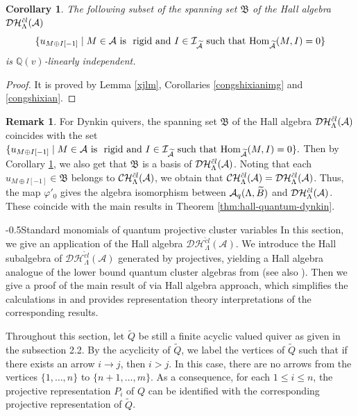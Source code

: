 \documentclass[reqno,12pt]{amsart}
\makeatletter
\numberwithin{equation}{section}
\theoremstyle{plain} %
\newtheorem{corollary}[theorem]{\bf Corollary}
\theoremstyle{definition} %
\newtheorem{remark}[theorem]{\bf Remark}
\renewcommand{\section}{\@startsection{section}{1}{0mm}
  {-\baselineskip}{0.5\baselineskip}{\bf\leftline}}
\makeatother
\begin{document}
\begin{corollary}\label{xxwguan}
The following subset of the spanning set $\mathfrak{B}$ of the Hall algebra $\mathcal {D}\mathcal {H}_\Lambda^{{\tilde{c}l}}({\mathcal{A}})$\[\{u_{M\oplus I[-1]}\mid M\in \mathcal{A}~\text{is ~rigid~and}~I\in \mathcal{I}_{\widetilde{\mathcal{A}}}~\text{such that}~ \mbox{\rm Hom}_{\widetilde{\mathcal{A}}}(M,I)=0\}\]
is $\mathbb{Q}(v)$-linearly independent.
\end{corollary}
\begin{proof}
It is proved by Lemma \ref{xjlm}, Corollaries \ref{congshixianimg} and \ref{congshixian}.
\end{proof}
\begin{remark}
For Dynkin quivers, the spanning set $\mathfrak{B}$ of the Hall algebra $\mathcal {D}\mathcal {H}_\Lambda^{{\tilde{c}l}}({\mathcal{A}})$ coincides with the set
$\{u_{M\oplus I[-1]}\mid M\in \mathcal{A}~\text{is ~rigid~and}~I\in \mathcal{I}_{\widetilde{\mathcal{A}}}~\text{such that}~ \mbox{\rm Hom}_{\widetilde{\mathcal{A}}}(M,I)=0\}.$
Then by Corollary \ref{xxwguan}, we also get that $\mathfrak{B}$ is a basis of $\mathcal {D}\mathcal {H}_\Lambda^{{\tilde{c}l}}({\mathcal{A}})$. Noting that each $u_{M\oplus I[-1]}\in\mathfrak{B}$ belongs to $\mathcal {C}\mathcal {H}_\Lambda^{{\tilde{c}l}}({\mathcal{A}})$, we obtain that $\mathcal {C}\mathcal {H}_\Lambda^{{\tilde{c}l}}({\mathcal{A}})=\mathcal {D}\mathcal {H}_\Lambda^{{\tilde{c}l}}({\mathcal{A}})$. Thus,
the map $\varphi'_0$ gives the algebra isomorphism between $\mathcal{A}_q(\Lambda,\widetilde{B})$ and $\mathcal {D}\mathcal {H}_\Lambda^{{\tilde{c}l}}({\mathcal{A}})$. These coincide with the main results in Theorem \ref{thm:hall-quantum-dynkin}.
\end{remark}

\section{Standard monomials of quantum projective cluster variables}
In this section, we give an application of the Hall algebra $\mathcal{D}\mathcal{H}_\Lambda^{\tilde{c}l}(\mathcal{A})$. We introduce the Hall subalgebra of $\mathcal{D}\mathcal{H}_\Lambda^{\tilde{c}l}(\mathcal{A})$ generated by projectives, yielding a Hall algebra analogue of the lower bound quantum cluster algebras from \cite{HCDX} (see also \cite{BNI}). Then we give a proof of the main result of \cite{HCDX} via Hall algebra approach, which simplifies the calculations in \cite{HCDX} and provides representation theory interpretations of the corresponding results.


Throughout this section, let $\widetilde{Q}$ be still a finite acyclic valued quiver as given in the subsection 2.2. By the acyclicity of $\widetilde{Q}$, we label the vertices of $\widetilde{Q}$ such that if there exists an arrow $i\to j$, then $i>j$. In this case, there are no arrows from the vertices $\{1,\ldots, n\}$ to $\{n+1,\ldots, m\}$. As a consequence, for each $1\leq i\leq n$, the projective representation $P_i$ of $Q$ can be identified with the corresponding projective representation of $\widetilde{Q}$.
\end{document}
